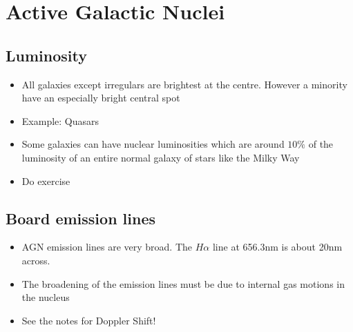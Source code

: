 \documentclass{article}
\begin{document}
\section{Active Galactic Nuclei}
\subsection{Luminosity}
\begin{itemize}
\item All galaxies except irregulars are brightest at the centre. However a minority have an especially bright central spot
\item Example: Quasars
\item Some galaxies can have nuclear luminosities which are around $10\%$ of the luminosity of an entire normal galaxy of stars like the Milky Way
\item Do exercise 
\end{itemize}
\subsection{Board emission lines}
\begin{itemize}
\item AGN emission lines are very broad. The $H\alpha$ line at 656.3nm is about 20nm across.
\item The broadening of the emission lines must be due to internal gas motions
in the nucleus
\item See the notes for Doppler Shift!
\end{itemize}
\end{document}
